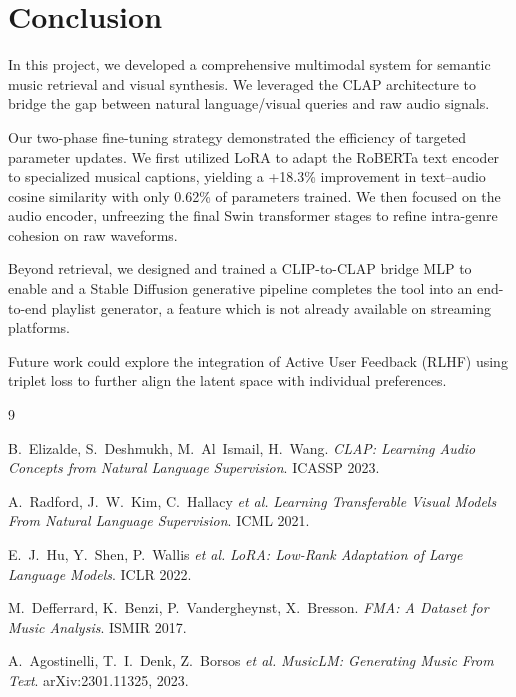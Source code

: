 \documentclass[11pt]{article}
\begin{document}
\section{Conclusion}
In this project, we developed a comprehensive multimodal system for semantic music retrieval and visual synthesis. We leveraged the CLAP architecture to bridge the gap between natural language/visual queries and raw audio signals.

Our two-phase fine-tuning strategy demonstrated the efficiency of targeted parameter updates. We first utilized LoRA to adapt the RoBERTa text encoder to specialized musical captions, yielding a +18.3\% improvement in text--audio cosine similarity with only 0.62\% of parameters trained. We then focused on the audio encoder, unfreezing the final Swin transformer stages to refine intra-genre cohesion on raw waveforms.

Beyond retrieval, we designed and trained a CLIP-to-CLAP bridge MLP to enable and a Stable Diffusion generative pipeline completes the tool into an end-to-end playlist generator, a feature which is not already available on streaming platforms.

Future work could explore the integration of Active User Feedback (RLHF) using triplet loss to further align the latent space with individual preferences.
\begin{thebibliography}{9}

B.~Elizalde, S.~Deshmukh, M.~Al~Ismail, H.~Wang.
\textit{CLAP: Learning Audio Concepts from Natural Language Supervision}.
ICASSP 2023.

A.~Radford, J.~W.~Kim, C.~Hallacy \emph{et al.}
\textit{Learning Transferable Visual Models From Natural Language Supervision}.
ICML 2021.

E.~J.~Hu, Y.~Shen, P.~Wallis \emph{et al.}
\textit{LoRA: Low-Rank Adaptation of Large Language Models}.
ICLR 2022.

M.~Defferrard, K.~Benzi, P.~Vandergheynst, X.~Bresson.
\textit{FMA: A Dataset for Music Analysis}.
ISMIR 2017.

A.~Agostinelli, T.~I.~Denk, Z.~Borsos \emph{et al.}
\textit{MusicLM: Generating Music From Text}.
arXiv:2301.11325, 2023.

\end{thebibliography}
\end{document}
